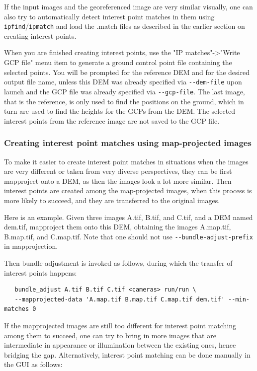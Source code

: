 If the input images and the georeferenced image are very similar
visually, one can also try to automatically detect interest point
matches in them using \texttt{ipfind}/\texttt{ipmatch} and load the
.match files as described in the earlier section on creating interest
points.

When you are finished creating interest points, use the "IP
matches"->"Write GCP file" menu item to generate a ground control point
file containing the selected points. You will be prompted for the
reference DEM and for the desired output file name, unless this DEM was
already specified via \texttt{-\/-dem-file} upon launch and
the GCP file was already specified via \texttt{-\/-gcp-file}. The last image,
that is the reference, is only used to find the positions on the ground,
which in turn are used to find the heights for the GCPs from the
DEM. The selected interest points from the reference image are not saved
to the GCP file.

\subsubsection{Creating interest point matches using map-projected images}
\label{mapip}

To make it easier to create interest point matches in situations when
the images are very different or taken from very diverse perspectives,
they can be first mapproject onto a DEM, as then the images look a lot
more similar. Then interest points are created among the map-projected
images, when this process is more likely to succeed, and they 
are transferred to the original images.

Here is an example. Given three images A.tif, B.tif, and C.tif, and a DEM named 
dem.tif, mapproject them onto this DEM, obtaining the images A.map.tif, B.map.tif, and C.map.tif.
Note that one should not use \texttt{-\/-bundle-adjust-prefix} in mapprojection.

Then bundle adjustment is invoked as follows, during which the transfer
of interest points happens:

\begin{verbatim}
   bundle_adjust A.tif B.tif C.tif <cameras> run/run \
   --mapprojected-data 'A.map.tif B.map.tif C.map.tif dem.tif' --min-matches 0  
\end{verbatim}

If the mapprojected images are still too different for interest point
matching among them to succeed, one can try to bring in more images that
are intermediate in appearance or illumination between the existing
ones, hence bridging the gap. Alternatively, interest point matching
can be done manually in the GUI as follows: 

